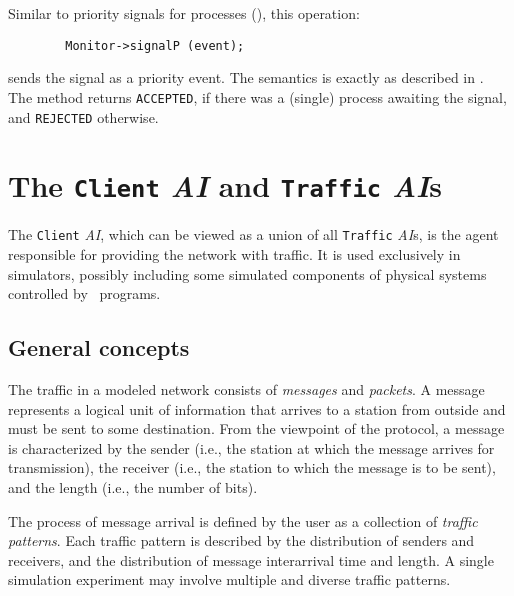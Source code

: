 Similar to priority signals for processes (), this operation:
\begin{verbatim}
        Monitor->signalP (event);
\end{verbatim}
\noindent
sends the signal as a priority event.
The semantics is exactly as described in .
The method returns {\tt ACCEPTED}, if there was a (single) process awaiting
the signal, and {\tt REJECTED} otherwise.

\section{The {\tt Client} {\em AI\/} and {\tt Traffic} {\em AI\/}s}
\label{rm_cl}

The {\tt Client} {\em AI}, which can be viewed as a union of all
{\tt Traffic\/} {\em AI\/}s, is the agent responsible for providing the
network with traffic.
It is used exclusively in simulators, possibly including some
simulated components of physical systems controlled by \smurph\ programs.

\subsection{General concepts}
\label{rm_cl_gc}

The traffic in a modeled network consists of {\em messages\/} and
{\em packets}.
A message represents a logical unit of information that arrives to a
station from outside and must be sent to some destination.
From the viewpoint of the protocol,
a message is characterized by the sender (i.e., the station at which
the message arrives for transmission), the receiver (i.e., the station to
which the message is to be sent), and the length (i.e., the number of
bits).

The process of message arrival is defined by the user
as a collection of {\em traffic patterns}.
Each traffic pattern is described by the distribution of senders
and receivers, and the distribution of message interarrival time and
length.
A single simulation experiment may involve multiple and diverse
traffic patterns.

